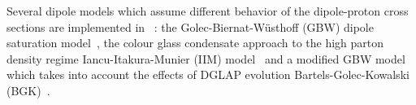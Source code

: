 
Several dipole models which assume different behavior of the dipole-proton 
cross sections are implemented in \fitter\ :
the Golec-Biernat-W\"usthoff (GBW)
dipole saturation model~\cite{Golec-Biernat:1998js},
the colour glass condensate approach to the high parton density 
regime Iancu-Itakura-Munier (IIM) model~\cite{Iancu:2003ge} and 
a modified GBW model which takes into account the effects of  
DGLAP evolution Bartels-Golec-Kowalski (BGK)~\cite{Bartels:2002cj}.

